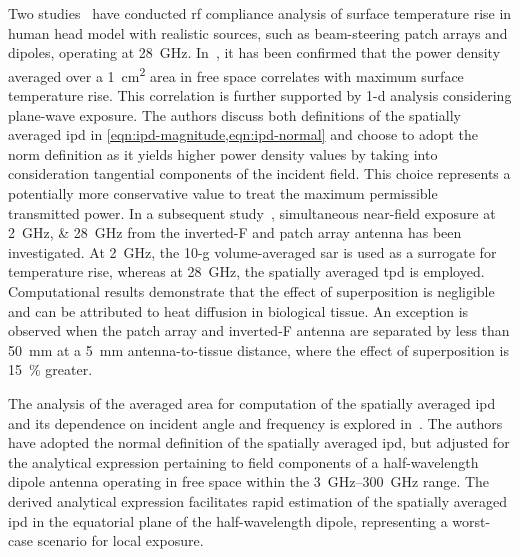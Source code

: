 Two studies~\cite{He2018RF,Miura2021Power} have conducted \gls{rf} compliance analysis of surface temperature rise in human head model with realistic sources, such as beam-steering patch arrays and dipoles, operating at \SI{28}{\GHz}.
In~\cite{He2018RF}, it has been confirmed that the power density averaged over a \SI{1}{\cm\squared} area in free space correlates with maximum surface temperature rise.
This correlation is further supported by \gls{1-d} analysis considering plane-wave exposure.
The authors discuss both definitions of the spatially averaged \gls{ipd} in \cref{eqn:ipd-magnitude,eqn:ipd-normal} and choose to adopt the norm definition as it yields higher power density values by taking into consideration tangential components of the incident field.
This choice represents a potentially more conservative value to treat the maximum permissible transmitted power.
In a subsequent study~\cite{Miura2021Power}, simultaneous near-field exposure at \SIlist{2;28}{\GHz} from the inverted-F and patch array antenna has been investigated.
At \SI{2}{\GHz}, the 10-g volume-averaged \gls{sar} is used as a surrogate for temperature rise, whereas at \SI{28}{\GHz}, the spatially averaged \gls{tpd} is employed.
Computational results demonstrate that the effect of superposition is negligible and can be attributed to heat diffusion in biological tissue.
An exception is observed when the patch array and inverted-F antenna are separated by less than \SI{50}{\mm} at a \SI{5}{\mm} antenna-to-tissue distance, where the effect of superposition is \SI{15}{\percent} greater.

The analysis of the averaged area for computation of the spatially averaged \gls{ipd} and its dependence on incident angle and frequency is explored in~\cite{Poljak2020Assessment}.
The authors have adopted the normal definition of the spatially averaged \gls{ipd}, but adjusted for the analytical expression pertaining to field components of a half-wavelength dipole antenna operating in free space within the \SIrange{3}{300}{\GHz} range.
The derived analytical expression facilitates rapid estimation of the spatially averaged \gls{ipd} in the equatorial plane of the half-wavelength dipole, representing a worst-case scenario for local exposure.

